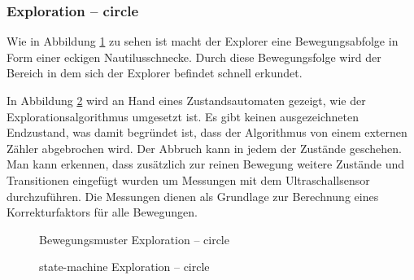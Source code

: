 \documentclass[10pt,a4paper]{scrartcl}
\begin{document}
\subsubsection{Exploration -- circle}
Wie in Abbildung \ref{circle} zu sehen ist macht der Explorer eine Bewegungsabfolge in Form einer eckigen Nautilusschnecke. Durch diese Bewegungsfolge wird der Bereich in dem sich der Explorer befindet schnell erkundet.

In Abbildung \ref{state_circle} wird an Hand eines Zustandsautomaten gezeigt, wie der Explorationsalgorithmus umgesetzt ist. Es gibt keinen ausgezeichneten Endzustand, was damit begründet ist, dass der Algorithmus von einem externen Zähler abgebrochen wird. Der Abbruch kann in jedem der Zustände geschehen. Man kann erkennen, dass zusätzlich zur reinen Bewegung weitere Zustände und Transitionen eingefügt wurden um Messungen mit dem Ultraschallsensor durchzuführen. Die Messungen dienen als Grundlage zur Berechnung eines Korrekturfaktors für alle Bewegungen.
\begin{figure}[h]
\centering
{}
\caption{Bewegungsmuster Exploration -- circle}
\label{circle}
\end{figure}
\begin{figure}[h]
\centering
{}
\caption{state-machine Exploration -- circle}
\label{state_circle}
\end{figure}
\end{document}
